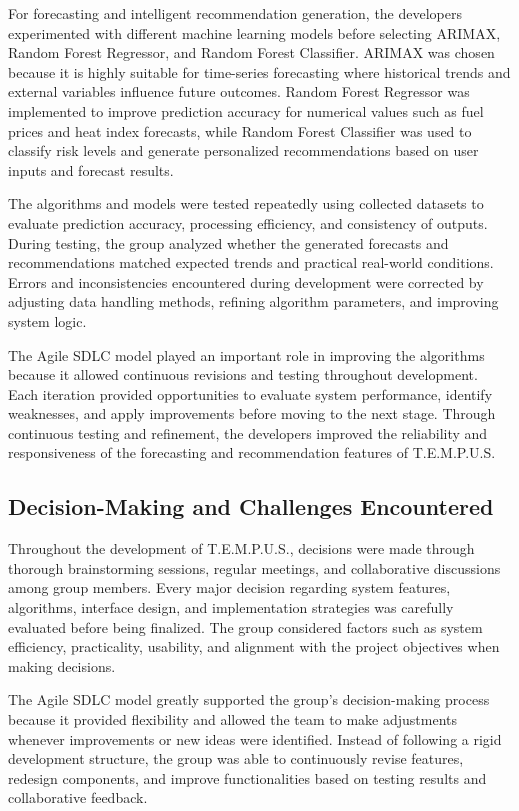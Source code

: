 \documentclass[12pt]{article}
\begin{document}
For forecasting and intelligent recommendation generation, the developers experimented with different machine learning models before selecting ARIMAX, Random Forest Regressor, and Random Forest Classifier. ARIMAX was chosen because it is highly suitable for time-series forecasting where historical trends and external variables influence future outcomes. Random Forest Regressor was implemented to improve prediction accuracy for numerical values such as fuel prices and heat index forecasts, while Random Forest Classifier was used to classify risk levels and generate personalized recommendations based on user inputs and forecast results.

The algorithms and models were tested repeatedly using collected datasets to evaluate prediction accuracy, processing efficiency, and consistency of outputs. During testing, the group analyzed whether the generated forecasts and recommendations matched expected trends and practical real-world conditions. Errors and inconsistencies encountered during development were corrected by adjusting data handling methods, refining algorithm parameters, and improving system logic.

The Agile SDLC model played an important role in improving the algorithms because it allowed continuous revisions and testing throughout development. Each iteration provided opportunities to evaluate system performance, identify weaknesses, and apply improvements before moving to the next stage. Through continuous testing and refinement, the developers improved the reliability and responsiveness of the forecasting and recommendation features of T.E.M.P.U.S.

\subsection{Decision-Making and Challenges Encountered}

Throughout the development of T.E.M.P.U.S., decisions were made through thorough brainstorming sessions, regular meetings, and collaborative discussions among group members. Every major decision regarding system features, algorithms, interface design, and implementation strategies was carefully evaluated before being finalized. The group considered factors such as system efficiency, practicality, usability, and alignment with the project objectives when making decisions.

The Agile SDLC model greatly supported the group's decision-making process because it provided flexibility and allowed the team to make adjustments whenever improvements or new ideas were identified. Instead of following a rigid development structure, the group was able to continuously revise features, redesign components, and improve functionalities based on testing results and collaborative feedback.
\end{document}

